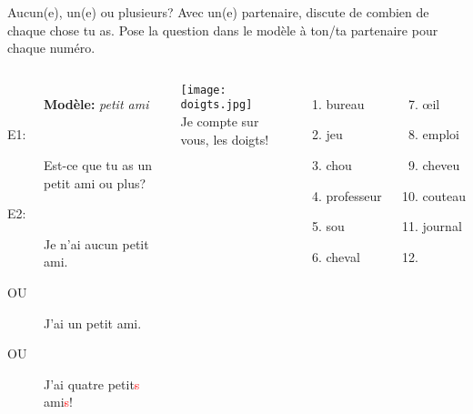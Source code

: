 \begin{frame}{Aucun(e), un(e) ou plusieurs?}
  Avec un(e) partenaire, discute de combien de chaque chose tu as.
  Pose la question dans le modèle à ton/ta partenaire pour chaque numéro.
  \begin{columns}
      \small
      \begin{description}
        \item[] \textbf{Modèle:} \emph{petit ami}
        \item[E1:] Est-ce que tu as un petit ami ou plus?
        \item[E2:] Je n'ai aucun petit ami.
        \item[OU] J'ai un petit ami.
        \item[OU] J'ai \alert{quatre} petit\textcolor{red}{s} ami\textcolor{red}{s}!
      \end{description}
      \begin{center}
        \texttt{[image: doigts.jpg]} \\
        \tiny
        Je compte sur vous, les doigts!
      \end{center}
      \begin{enumerate}
        \item bureau
        \item jeu
        \item chou
        \item professeur
        \item sou
        \item cheval
      \end{enumerate}
      \begin{enumerate}
        \setcounter{enumi}{6}
        \item œil
        \item emploi
        \item cheveu
        \item couteau
        \item journal
        \item[] \ 
      \end{enumerate}
  \end{columns}
\end{frame}